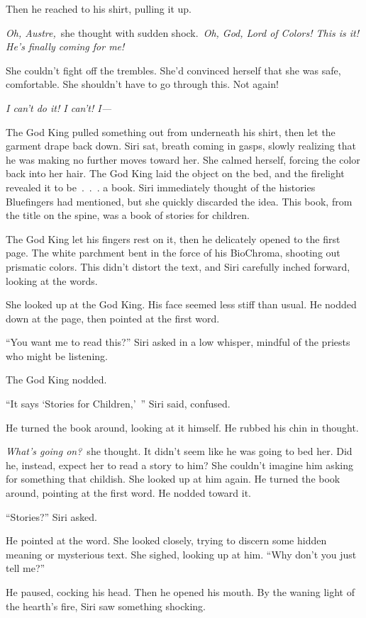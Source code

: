 Then he reached to his shirt, pulling it up.

\textit{Oh, Austre,}~she thought with sudden shock.~\textit{Oh, God, Lord of Colors! This is it! He’s finally coming for me!}

She couldn’t fight off the trembles. She’d convinced herself that she was safe, comfortable. She shouldn’t have to go through this. Not again!

\textit{I can’t do it! I can’t! I—}

The God King pulled something out from underneath his shirt, then let the garment drape back down. Siri sat, breath coming in gasps, slowly realizing that he was making no further moves toward her. She calmed herself, forcing the color back into her hair. The God King laid the object on the bed, and the firelight revealed it to be~.~.~. a book. Siri immediately thought of the histories Bluefingers had mentioned, but she quickly discarded the idea. This book, from the title on the spine, was a book of stories for children.

The God King let his fingers rest on it, then he delicately opened to the first page. The white parchment bent in the force of his BioChroma, shooting out prismatic colors. This didn’t distort the text, and Siri carefully inched forward, looking at the words.

She looked up at the God King. His face seemed less stiff than usual. He nodded down at the page, then pointed at the first word.

“You want me to read this?” Siri asked in a low whisper, mindful of the priests who might be listening.

The God King nodded.

“It says ‘Stories for Children,’~” Siri said, confused.

He turned the book around, looking at it himself. He rubbed his chin in thought.

\textit{What’s going on?}~she thought. It didn’t seem like he was going to bed her. Did he, instead, expect her to read a story to him? She couldn’t imagine him asking for something that childish. She looked up at him again. He turned the book around, pointing at the first word. He nodded toward it.

“Stories?” Siri asked.

He pointed at the word. She looked closely, trying to discern some hidden meaning or mysterious text. She sighed, looking up at him. “Why don’t you just tell me?”

He paused, cocking his head. Then he opened his mouth. By the waning light of the hearth’s fire, Siri saw something shocking.

